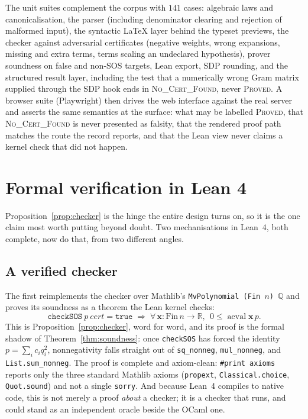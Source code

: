 \documentclass[11pt]{article}
\theoremstyle{definition}
\theoremstyle{plain}
\newcommand{\R}{\mathbb{R}}
\newcommand{\Q}{\mathbb{Q}}
\newcommand{\x}{\mathbf{x}}
\begin{document}
\smallskip
The unit suites complement the corpus with $141$ cases: algebraic laws and
canonicalisation, the parser (including denominator clearing and rejection of
malformed input), the syntactic LaTeX layer behind the typeset previews, the
checker against adversarial certificates (negative
weights, wrong expansions, missing and extra terms, terms scaling an undeclared
hypothesis), prover soundness on false and non-SOS targets, Lean export, SDP
rounding, and the structured result layer, including the test that a
numerically wrong Gram matrix supplied through the SDP hook ends in
\textsc{No\_Cert\_Found}, never \textsc{Proved}. A browser suite (Playwright)
then drives the web interface against the real server and asserts the same
semantics at the surface: what may be labelled \textsc{Proved}, that
\textsc{No\_Cert\_Found} is never presented as falsity, that the rendered
proof path matches the route the record reports, and that the Lean view never
claims a kernel check that did not happen.

\section{Formal verification in Lean 4}
\label{sec:lean}

Proposition~\ref{prop:checker} is the hinge the entire design turns on, so it is
the one claim most worth putting beyond doubt. Two mechanisations in Lean~4, both
complete, now do that, from two different angles.

\subsection{A verified checker}

The first reimplements the checker over Mathlib's
\texttt{MvPolynomial (Fin\,$n$)\,$\Q$} and proves its soundness as a theorem the
Lean kernel checks:
\[
  \texttt{checkSOS}\ p\ \mathit{cert} = \texttt{true}
  \;\Longrightarrow\;
  \forall\,\x : \mathrm{Fin}\,n \to \R,\ \ 0 \le \operatorname{aeval} \x\, p .
\]
This is Proposition~\ref{prop:checker}, word for word, and its proof is the
formal shadow of Theorem~\ref{thm:soundness}: once \texttt{checkSOS} has forced
the identity $p = \sum_i c_i q_i^2$, nonnegativity falls straight out of
\texttt{sq\_nonneg}, \texttt{mul\_nonneg}, and \texttt{List.sum\_nonneg}. The
proof is complete and axiom-clean: \texttt{\#print axioms} reports only the
three standard Mathlib axioms (\texttt{propext}, \texttt{Classical.choice},
\texttt{Quot.sound}) and not a single \texttt{sorry}. And because Lean~4 compiles
to native code, this is not merely a proof \emph{about} a checker; it is a
checker that runs, and could stand as an independent oracle beside the OCaml one.
\end{document}
